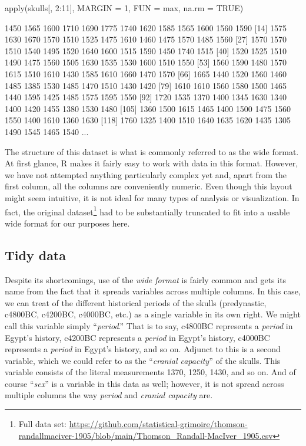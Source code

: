 \begin{inR}
apply(skulls[, 2:11], MARGIN = 1, FUN = max, na.rm = TRUE)
\end{inR}

\begin{outR}
  [1] 1450 1565 1600 1710 1690 1775 1740 1620 1585 1565 1600 1560 1590
 [14] 1575 1630 1670 1570 1510 1525 1475 1610 1460 1475 1570 1485 1560
 [27] 1570 1570 1510 1540 1495 1520 1640 1600 1515 1590 1450 1740 1515
 [40] 1520 1525 1510 1490 1475 1560 1505 1630 1535 1530 1600 1510 1550
 [53] 1560 1590 1480 1570 1615 1510 1610 1430 1585 1610 1660 1470 1570
 [66] 1665 1440 1520 1560 1460 1485 1385 1530 1485 1470 1510 1430 1420
 [79] 1610 1610 1560 1580 1500 1465 1440 1595 1425 1485 1575 1595 1550
 [92] 1720 1535 1370 1400 1345 1630 1340 1400 1420 1455 1380 1530 1480
[105] 1360 1500 1615 1465 1400 1500 1475 1560 1550 1400 1610 1360 1630
[118] 1760 1325 1400 1510 1640 1635 1620 1435 1305 1490 1545 1465 1540
...
\end{outR}

The structure of this dataset is what is commonly referred to as the \gls{wide format}. At first glance, R makes it fairly easy to work with data in this format. However, we have not attempted anything particularly complex yet and, apart from the first column, all the columns are conveniently numeric. Even though this layout might seem intuitive, it is not ideal for many types of analysis or visualization. In fact, the original dataset\footnote{Full data set: \url{https://github.com/statistical-grimoire/thomson-randallmaciver-1905/blob/main/Thomson_Randall-MacIver_1905.csv}} had to be substantially truncated to fit into a usable wide format for our purposes here.

\clearpage

\subsection{Tidy data}

Despite its shortcomings, use of the \textit{wide format} is fairly common and gets its name from the fact that it spreads variables across multiple columns. In this case, we can treat of the different historical periods of the skulls (predynastic, c4800BC, c4200BC, c4000BC, etc.) as a single variable in its own right. We might call this variable simply ``\textit{period}.'' That is to say, c4800BC represents a \textit{period} in Egypt's history, c4200BC represents a \textit{period} in Egypt's history, c4000BC represents a \textit{period} in Egypt's history, and so on. Adjunct to this is a second variable, which we could refer to as the ``\textit{cranial capacity}'' of the skulls. This variable consists of the literal measurements 1370, 1250, 1430, and so on. And of course ``\textit{sex}'' is a variable in this data as well; however, it is not spread across multiple columns the way \textit{period} and \textit{cranial capacity} are. 

